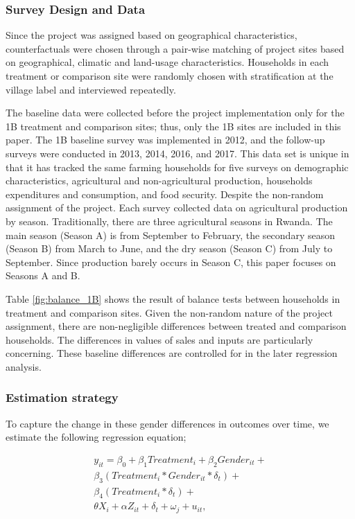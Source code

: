\documentclass[12pt]{article}
\begin{document}
\subsubsection*{Survey Design and Data}
	Since the project was assigned based on geographical characteristics, counterfactuals were chosen through a pair-wise matching of project sites based on geographical, climatic and land-usage characteristics. Households in each treatment or comparison site were randomly chosen with stratification at the village label and interviewed repeatedly. 
		
	The baseline data were collected before the project implementation only for the 1B treatment and comparison sites; thus, only the 1B sites are included in this paper. The 1B baseline survey was implemented in 2012, and the follow-up surveys were conducted in 2013, 2014, 2016, and 2017. This data set is unique in that it has tracked the same farming households for five surveys on demographic characteristics, agricultural and non-agricultural production, households expenditures and consumption, and food security. Despite the non-random assignment of the project. Each survey collected data on agricultural production by season. Traditionally, there are three agricultural seasons in Rwanda. The main season (Season A) is from September to February, the secondary season (Season B) from March to June, and the dry season (Season C) from July to September. Since production barely occurs in Season C, this paper focuses on Seasons A and B.
		
	Table \ref{fig:balance_1B} shows the result of balance tests between households in treatment and comparison sites. Given the non-random nature of the project assignment, there are non-negligible differences between treated and comparison households. The differences in values of sales and inputs are particularly concerning. These baseline differences are controlled for in the later regression analysis. 

	
\subsubsection*{Estimation strategy}
	
	To capture the change in these gender differences in outcomes over time, we estimate the following regression equation;
	
	\begin{equation}
	\begin{aligned}
	y_{it} = \beta_{0} + \beta_{1}Treatment_{i} + \beta_{2}Gender_{it} + \\ \beta_{3}(Treatment_{i}*Gender_{it}*\delta_{t}) + \\
	\beta_{4}(Treatment_{i}*\delta_{t}) + \\
	\theta X_{i} + \alpha Z_{it} + \delta_{t}  + \omega_{j} + u_{it}, 
	\end{aligned}
	\end{equation}
	
\end{document}
